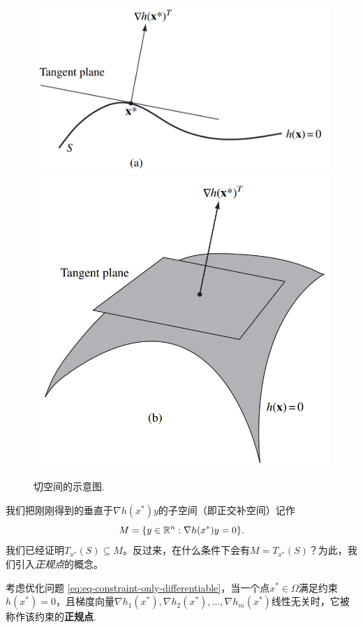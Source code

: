 \begin{figure}
\centering
    \includegraphics[scale=0.4]{Chapters/duality/figures/tan-1dim.png}
\centering
    \includegraphics[scale=0.4]{Chapters/duality/figures/tan-2dim.png}
\caption{切空间的示意图.}
\label{fig:tangent-space}
\end{figure}
    
我们把刚刚得到的垂直于$\nabla {h(x^\ast)y}$的子空间（即正交补空间）记作
    \[M=\{{y}\in\mathbb{R}^n:\nabla {h(x^\ast)y}=0\}.\]
我们已经证明$T_{x^\ast}(S)\subseteq M$。反过来，在什么条件下会有$M=T_{x^\ast}(S)$？为此，我们引入\emph{正规点}的概念。

\begin{definition}[正规点]\label{def:regular-point}
考虑优化问题 \eqref{eq:eq-constraint-only-differentiable}，当一个点${x^\ast}\in\Omega$满足约束${h(x^\ast)}=0$，且梯度向量$\nabla h_1({x^\ast}),\nabla h_2({x^\ast}),\dots,\nabla h_m({x^\ast})$线性无关时，它被称作该约束的\textbf{正规点}. 
\end{definition}

